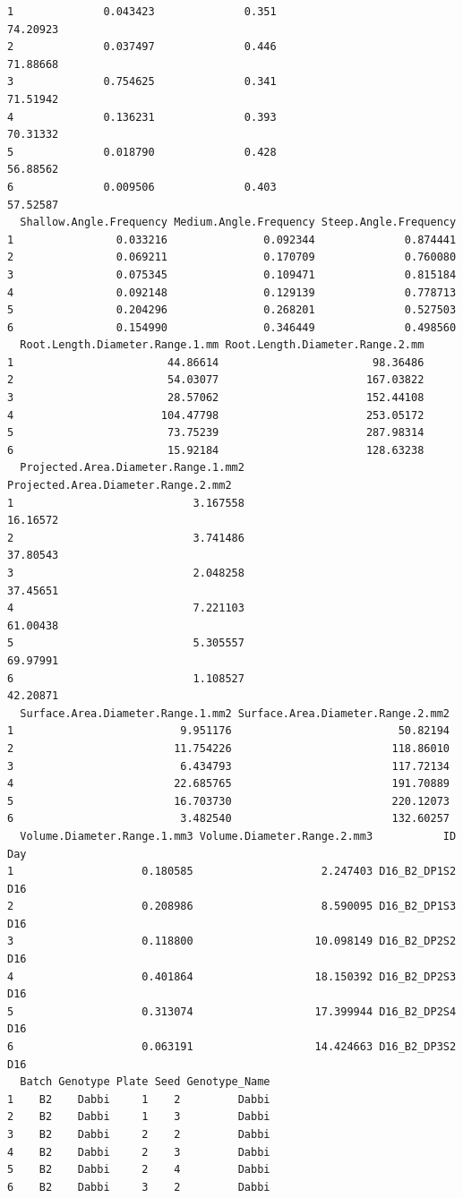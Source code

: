 \documentclass[
  letterpaper,
  DIV=11,
  numbers=noendperiod]{scrartcl}
\begin{document}
\begin{verbatim}
1              0.043423              0.351                     74.20923
2              0.037497              0.446                     71.88668
3              0.754625              0.341                     71.51942
4              0.136231              0.393                     70.31332
5              0.018790              0.428                     56.88562
6              0.009506              0.403                     57.52587
  Shallow.Angle.Frequency Medium.Angle.Frequency Steep.Angle.Frequency
1                0.033216               0.092344              0.874441
2                0.069211               0.170709              0.760080
3                0.075345               0.109471              0.815184
4                0.092148               0.129139              0.778713
5                0.204296               0.268201              0.527503
6                0.154990               0.346449              0.498560
  Root.Length.Diameter.Range.1.mm Root.Length.Diameter.Range.2.mm
1                        44.86614                        98.36486
2                        54.03077                       167.03822
3                        28.57062                       152.44108
4                       104.47798                       253.05172
5                        73.75239                       287.98314
6                        15.92184                       128.63238
  Projected.Area.Diameter.Range.1.mm2 Projected.Area.Diameter.Range.2.mm2
1                            3.167558                            16.16572
2                            3.741486                            37.80543
3                            2.048258                            37.45651
4                            7.221103                            61.00438
5                            5.305557                            69.97991
6                            1.108527                            42.20871
  Surface.Area.Diameter.Range.1.mm2 Surface.Area.Diameter.Range.2.mm2
1                          9.951176                          50.82194
2                         11.754226                         118.86010
3                          6.434793                         117.72134
4                         22.685765                         191.70889
5                         16.703730                         220.12073
6                          3.482540                         132.60257
  Volume.Diameter.Range.1.mm3 Volume.Diameter.Range.2.mm3           ID Day
1                    0.180585                    2.247403 D16_B2_DP1S2 D16
2                    0.208986                    8.590095 D16_B2_DP1S3 D16
3                    0.118800                   10.098149 D16_B2_DP2S2 D16
4                    0.401864                   18.150392 D16_B2_DP2S3 D16
5                    0.313074                   17.399944 D16_B2_DP2S4 D16
6                    0.063191                   14.424663 D16_B2_DP3S2 D16
  Batch Genotype Plate Seed Genotype_Name
1    B2    Dabbi     1    2         Dabbi
2    B2    Dabbi     1    3         Dabbi
3    B2    Dabbi     2    2         Dabbi
4    B2    Dabbi     2    3         Dabbi
5    B2    Dabbi     2    4         Dabbi
6    B2    Dabbi     3    2         Dabbi
\end{verbatim}
\end{document}
